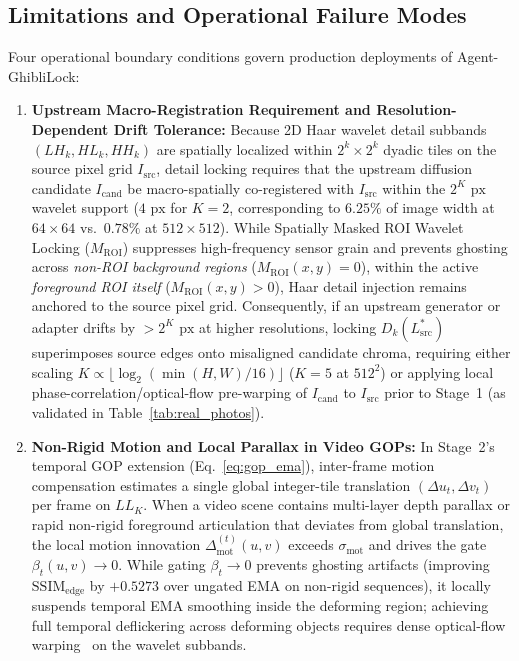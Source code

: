 \documentclass[conference,10pt]{IEEEtran}
\begin{document}
\subsection{Limitations and Operational Failure Modes}
Four operational boundary conditions govern production deployments of Agent-GhibliLock:
\begin{enumerate}
    \item \textbf{Upstream Macro-Registration Requirement and Resolution-Dependent Drift Tolerance:} Because 2D Haar wavelet detail subbands $(LH_k, HL_k, HH_k)$ are spatially localized within $2^k \times 2^k$ dyadic tiles on the source pixel grid $I_{\text{src}}$, detail locking requires that the upstream diffusion candidate $I_{\text{cand}}$ be macro-spatially co-registered with $I_{\text{src}}$ within the $2^K\text{ px}$ wavelet support ($4\text{ px}$ for $K=2$, corresponding to $6.25\%$ of image width at $64\times 64$ vs.\ $0.78\%$ at $512\times 512$). While Spatially Masked ROI Wavelet Locking ($M_{\text{ROI}}$) suppresses high-frequency sensor grain and prevents ghosting across \emph{non-ROI background regions} ($M_{\text{ROI}}(x,y) = 0$), within the active \emph{foreground ROI itself} ($M_{\text{ROI}}(x,y) > 0$), Haar detail injection remains anchored to the source pixel grid. Consequently, if an upstream generator or adapter drifts by $> 2^K\text{ px}$ at higher resolutions, locking $D_k(L^*_{\text{src}})$ superimposes source edges onto misaligned candidate chroma, requiring either scaling $K \propto \lfloor \log_2(\min(H,W)/16) \rfloor$ ($K=5$ at $512^2$) or applying local phase-correlation/optical-flow pre-warping of $I_{\text{cand}}$ to $I_{\text{src}}$ prior to Stage~1 (as validated in Table~\ref{tab:real_photos}).
    \item \textbf{Non-Rigid Motion and Local Parallax in Video GOPs:} In Stage~2's temporal GOP extension (Eq.~\ref{eq:gop_ema}), inter-frame motion compensation estimates a single global integer-tile translation $(\Delta u_t, \Delta v_t)$ per frame on $LL_K$. When a video scene contains multi-layer depth parallax or rapid non-rigid foreground articulation that deviates from global translation, the local motion innovation $\Delta_{\text{mot}}^{(t)}(u,v)$ exceeds $\sigma_{\text{mot}}$ and drives the gate $\beta_t(u,v) \to 0$. While gating $\beta_t \to 0$ prevents ghosting artifacts (improving $\mathrm{SSIM}_{\text{edge}}$ by $+0.5273$ over ungated EMA on non-rigid sequences), it locally suspends temporal EMA smoothing inside the deforming region; achieving full temporal deflickering across deforming objects requires dense optical-flow warping~\cite{bonneel2015blind} on the wavelet subbands.

\end{enumerate}
\end{document}
